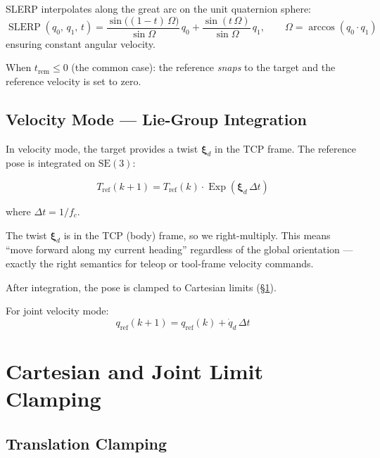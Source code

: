 \documentclass[11pt,a4paper]{article}
\newcommand{\SE}{\mathrm{SE}}
\newcommand{\Exp}{\operatorname{Exp}}
\newcommand{\SLERP}{\operatorname{SLERP}}
\begin{document}
SLERP interpolates along the great arc on the unit quaternion sphere:
\[
  \SLERP(q_0,\,q_1,\,t)
  = \frac{\sin\bigl((1-t)\,\Omega\bigr)}{\sin\Omega}\,q_0
    + \frac{\sin(t\,\Omega)}{\sin\Omega}\,q_1,
  \qquad
  \Omega = \arccos(q_0 \cdot q_1)
\]
ensuring constant angular velocity.

When $t_{\text{rem}} \le 0$ (the common case): the reference \emph{snaps} to
the target and the reference velocity is set to zero.

\subsection{Velocity Mode --- Lie-Group Integration}
\label{sec:vel_interp}

In velocity mode, the target provides a twist $\bm{\xi}_d$ in the TCP frame.
The reference pose is integrated on $\SE(3)$:

\begin{keqbox}
\begin{equation}
  T_{\text{ref}}(k\!+\!1)
  = T_{\text{ref}}(k) \cdot \Exp(\bm{\xi}_d\,\Delta t)
  \label{eq:vel_integ}
\end{equation}
\end{keqbox}

where $\Delta t = 1/f_c$.

\begin{reasonbox}
The twist $\bm{\xi}_d$ is in the TCP (body) frame, so we right-multiply.
This means ``move forward along my current heading'' regardless of the global
orientation --- exactly the right semantics for teleop or tool-frame velocity
commands.
\end{reasonbox}

After integration, the pose is clamped to Cartesian limits (\S\ref{sec:clamping}).

For joint velocity mode:
\[
  q_{\text{ref}}(k\!+\!1) = q_{\text{ref}}(k) + \dot{q}_d\,\Delta t
\]


\section{Cartesian and Joint Limit Clamping}
\label{sec:clamping}

\subsection{Translation Clamping}
\end{document}
